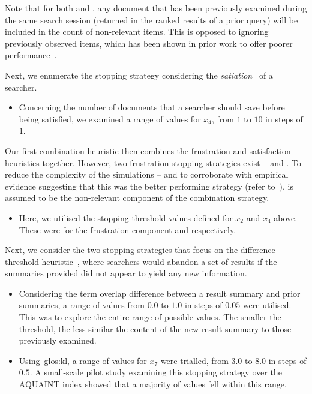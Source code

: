 Note that for both  and , any document that has been previously examined during the same search session (returned in the ranked results of a prior query) will be included in the count of non-relevant items. This is opposed to ignoring previously observed items, which has been shown in prior work to offer poorer performance~\citep{maxwell2015stopping_strategies}.

Next, we enumerate the stopping strategy considering the \emph{satiation}~\citep{simon1955satiation} of a searcher.

\begin{itemize}
    \item{ Concerning the number of documents that a searcher should save before being satisfied, we examined a range of values for $x_4$, from $1$ to $10$ in steps of $1$.}
\end{itemize}

Our first combination heuristic then combines the frustration and satisfaction heuristics together. However, two frustration stopping strategies exist --  and . To reduce the complexity of the simulations -- and to corroborate with empirical evidence suggesting that this was the better performing strategy (refer to~\cite{maxwell2015stopping_strategies}),  is assumed to be the non-relevant component of the combination strategy.

\begin{itemize}
    \item{ Here, we utilised the stopping threshold values defined for $x_2$ and $x_4$ above. These were for the frustration component  and  respectively.}
\end{itemize}

Next, we consider the two stopping strategies that focus on the difference threshold heuristic~\citep{nickles1995judgment}, where searchers would abandon a set of results if the summaries provided did not appear to yield any new information.

\begin{itemize}
    \item{ Considering the term overlap difference between a result summary and prior summaries, a range of values from $0.0$ to $1.0$ in steps of $0.05$ were utilised. This was to explore the entire range of possible values. The smaller the threshold, the less similar the content of the new result summary to those previously examined.}
    
    \item{ Using~\gls{glos:kl}, a range of values for $x_7$ were trialled, from $3.0$ to $8.0$ in steps of $0.5$. A small-scale pilot study examining this stopping strategy over the AQUAINT index showed that a majority of values fell within this range.}
\end{itemize}

